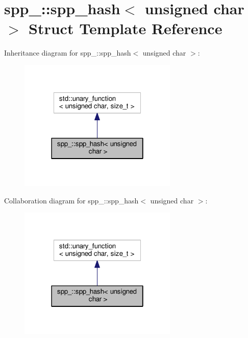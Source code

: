 \hypertarget{structspp___1_1spp__hash_3_01unsigned_01char_01_4}{}\section{spp\+\_\+\+:\+:spp\+\_\+hash$<$ unsigned char $>$ Struct Template Reference}
\label{structspp___1_1spp__hash_3_01unsigned_01char_01_4}


Inheritance diagram for spp\+\_\+\+:\+:spp\+\_\+hash$<$ unsigned char $>$\+:\nopagebreak
\begin{figure}[H]
\begin{center}
\leavevmode
\includegraphics[width=214pt]{structspp___1_1spp__hash_3_01unsigned_01char_01_4__inherit__graph}
\end{center}
\end{figure}


Collaboration diagram for spp\+\_\+\+:\+:spp\+\_\+hash$<$ unsigned char $>$\+:\nopagebreak
\begin{figure}[H]
\begin{center}
\leavevmode
\includegraphics[width=214pt]{structspp___1_1spp__hash_3_01unsigned_01char_01_4__coll__graph}
\end{center}
\end{figure}
